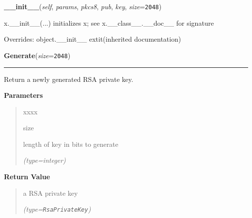     \vspace{0.5ex}

\hspace{.8\funcindent}\begin{boxedminipage}{\funcwidth}

    \raggedright \textbf{\_\_init\_\_}(\textit{self}, \textit{params}, \textit{pkcs8}, \textit{pub}, \textit{key}, \textit{size}={\tt 2048})

\setlength{\parskip}{2ex}
    x.\_\_init\_\_(...) initializes x; see x.\_\_class\_\_.\_\_doc\_\_ for 
    signature

\setlength{\parskip}{1ex}
      Overrides: object.\_\_init\_\_ 	extit{(inherited documentation)}

    \end{boxedminipage}

    \label{keyczar:keys:RsaPrivateKey:Generate}

    \vspace{0.5ex}

\hspace{.8\funcindent}\begin{boxedminipage}{\funcwidth}

    \raggedright \textbf{Generate}(\textit{size}={\tt 2048})

    \vspace{-1.5ex}

    \rule{\textwidth}{0.5\fboxrule}
\setlength{\parskip}{2ex}
    Return a newly generated RSA private key.

\setlength{\parskip}{1ex}
      \textbf{Parameters}
      \vspace{-1ex}

      \begin{quote}
        \begin{Ventry}{xxxx}

          \item[size]

          length of key in bits to generate

            {\it (type=integer)}

        \end{Ventry}

      \end{quote}

      \textbf{Return Value}
    \vspace{-1ex}

      \begin{quote}
      a RSA private key

      {\it (type=\texttt{RsaPrivateKey})}

      \end{quote}

    \end{boxedminipage}

